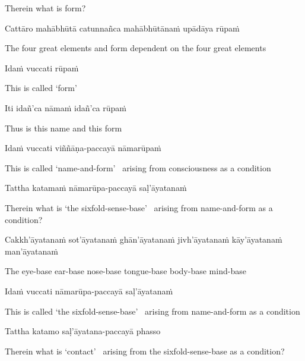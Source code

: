 \begin{english}
  Therein what is form?
\end{english}

Cattāro mahābhūtā catunnañca mahābhūtānaṁ upādāya rūpaṁ

\begin{english-hang}
  The four great elements and form dependent on the four great elements
\end{english-hang}

Idaṁ vuccati rūpaṁ

\begin{english}
  This is called `form'
\end{english}

Iti idañ'ca nāmaṁ idañ'ca rūpaṁ

\begin{english}
  Thus is this name and this form
\end{english}

Idaṁ vuccati viññāṇa-paccayā nāmarūpaṁ

\begin{english-hang}
  This is called `name-and-form' \breathmark\ arising from consciousness as a condition
\end{english-hang}

Tattha katamaṁ nāmarūpa-paccayā saḷ'āyatanaṁ

\begin{english-hang}
  Therein what is `the sixfold-sense-base' \breathmark\ arising from name-and-form as a condition?
\end{english-hang}

\begin{pali-hang}
  Cakkh'āyatanaṁ sot'āyatanaṁ ghān'āyatanaṁ jivh'āyatanaṁ kāy'āyatanaṁ man'āyatanaṁ
\end{pali-hang}

\begin{english-hang}
  The eye-base ear-base nose-base tongue-base body-base mind-base
\end{english-hang}

Idaṁ vuccati nāmarūpa-paccayā saḷ'āyatanaṁ

\begin{english-hang}
  This is called `the sixfold-sense-base' \breathmark\ arising from name-and-form as a condition
\end{english-hang}

Tattha katamo saḷ'āyatana-paccayā phasso

\begin{english-hang}
  Therein what is `contact' \breathmark\ arising from the sixfold-sense-base as a condition?
\end{english-hang}

